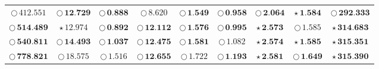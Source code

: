 \documentclass[
]{article}
\begin{document}
\begin{table}[!h]
\begin{tabular}[t]{ccccccccc}
\cellcolor[HTML]{FFFFFF}$\bigcirc\,412.551$ & \cellcolor[HTML]{2297E6}$\bigcirc\,\textbf{12.729}$ & \cellcolor[HTML]{DF536B}$\bigcirc\,\textbf{0.888}$ & \cellcolor[HTML]{FFFFFF}$\bigcirc\,8.620$ & \cellcolor[HTML]{F5C710}$\bigcirc\,\textbf{1.549}$ & \cellcolor[HTML]{2297E6}$\bigcirc\,\textbf{0.958}$ & \cellcolor[HTML]{F5C710}$\bigcirc\,\textbf{2.064}$ & \cellcolor[HTML]{2297E6}$\star\,\textbf{1.584}$ & \cellcolor[HTML]{F5C710}$\bigcirc\,\textbf{292.333}$\\
\cellcolor[HTML]{DF536B}$\bigcirc\,\textbf{514.489}$ & \cellcolor[HTML]{F5C710}$\star\,\textit{12.974}$ & \cellcolor[HTML]{2297E6}$\bigcirc\,\textbf{0.892}$ & \cellcolor[HTML]{2297E6}$\bigcirc\,\textbf{12.112}$ & \cellcolor[HTML]{2297E6}$\bigcirc\,\textbf{1.576}$ & \cellcolor[HTML]{DF536B}$\bigcirc\,\textbf{0.995}$ & \cellcolor[HTML]{2297E6}$\star\,\textbf{2.573}$ & \cellcolor[HTML]{FFFFFF}$\bigcirc\,1.585$ & \cellcolor[HTML]{F5C710}$\star\,\textbf{314.683}$\\
\cellcolor[HTML]{2297E6}$\bigcirc\,\textbf{540.811}$ & \cellcolor[HTML]{F5C710}$\bigcirc\,\textbf{14.493}$ & \cellcolor[HTML]{F5C710}$\bigcirc\,\textbf{1.037}$ & \cellcolor[HTML]{DF536B}$\bigcirc\,\textbf{12.475}$ & \cellcolor[HTML]{DF536B}$\bigcirc\,\textbf{1.581}$ & \cellcolor[HTML]{FFFFFF}$\bigcirc\,1.082$ & \cellcolor[HTML]{DF536B}$\star\,\textbf{2.574}$ & \cellcolor[HTML]{F5C710}$\star\,\textbf{1.585}$ & \cellcolor[HTML]{2297E6}$\star\,\textbf{315.351}$\\
\cellcolor[HTML]{F5C710}$\bigcirc\,\textbf{778.821}$ & \cellcolor[HTML]{FFFFFF}$\bigcirc\,18.575$ & \cellcolor[HTML]{FFFFFF}$\bigcirc\,1.516$ & \cellcolor[HTML]{F5C710}$\bigcirc\,\textbf{12.655}$ & \cellcolor[HTML]{FFFFFF}$\bigcirc\,1.722$ & \cellcolor[HTML]{F5C710}$\bigcirc\,\textbf{1.193}$ & \cellcolor[HTML]{F5C710}$\star\,\textbf{2.581}$ & \cellcolor[HTML]{F5C710}$\bigcirc\,\textbf{1.649}$ & \cellcolor[HTML]{DF536B}$\star\,\textbf{315.390}$\\
\bottomrule
\end{tabular}
\end{table}
\end{document}
